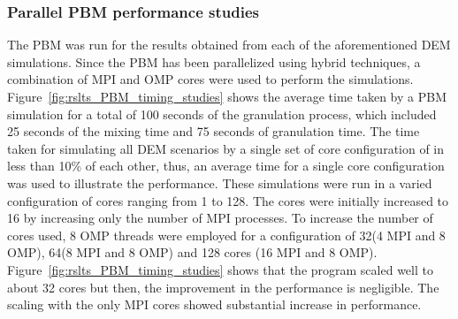 \documentclass[preprint,11pt,authoryear]{elsarticle}
\begin{document}
\subsubsection{Parallel PBM performance studies}
The PBM was run for the results obtained from each of the aforementioned DEM simulations. 
Since the PBM has been parallelized using hybrid techniques, a combination of MPI and OMP cores 
were used to perform the simulations. Figure~\ref{fig:rslts_PBM_timing_studies} shows the average time 
taken by a PBM simulation for a total of 100 seconds of the granulation process, which included 25 
seconds of the mixing time and 75 seconds of granulation time. The time taken for simulating all DEM 
scenarios by a single set of core configuration of in less than 10\% of each other, thus, an  average 
time for a single core configuration was used to illustrate the performance. 
These simulations were run in a varied configuration of cores ranging from 1 to 128. The cores were 
initially increased to 16 by increasing only the number of MPI processes. To increase the number of 
cores used, 8 OMP threads were employed for a configuration of 32(4 MPI  and 8 OMP), 64(8 MPI  and 8 OMP) 
and 128 cores (16 MPI  and 8 OMP). Figure~\ref{fig:rslts_PBM_timing_studies} shows that the program scaled 
well to about 32 cores but then, the improvement in the performance is negligible. The scaling with the 
only MPI cores showed substantial increase in performance.
\end{document}
